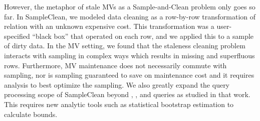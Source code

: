 However, the metaphor of stale MVs as a Sample-and-Clean problem only goes so far.
In SampleClean, we modeled data cleaning as a row-by-row transformation of relation with an unknown expensive cost. 
This transformation was a user-specified  ``black box'' that operated on each row, and we applied this to a sample of dirty data.
In the MV setting, we found that the staleness cleaning problem interacts with sampling in complex ways which results in missing and superfluous rows. 
Furthermore, MV maintenance does not necessarily commute with sampling, nor is sampling guaranteed to save on maintenance cost and it requires analysis to best optimize the sampling.
We also greatly expand the query processing scope of SampleClean beyond \sumfunc, \countfunc, and \avgfunc queries as studied in that work.
This requires new analytic tools such as statistical bootstrap estimation to calculate bounds.


